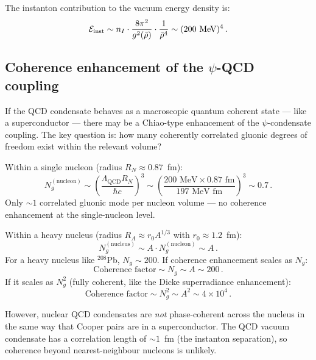 \documentclass[aps,prd,twocolumn,superscriptaddress,floatfix,nofootinbib]{revtex4-2}
\newcommand{\LQCD}{\Lambda_{\mathrm{QCD}}}
\begin{document}
The instanton contribution to the vacuum energy density is:
\begin{equation}
\mathcal{E}_{\rm inst} \sim n_I \cdot \frac{8\pi^2}{g^2(\bar{\rho})} \cdot
\frac{1}{\bar{\rho}^4} \sim (200 \text{ MeV})^4 \, .
\end{equation}

\subsection{Coherence enhancement of the $\psi$-QCD coupling}

If the QCD condensate behaves as a macroscopic quantum coherent state --- like a
superconductor --- there may be a Chiao-type enhancement of the
$\psi$-condensate coupling. The key question is: how many coherently correlated
gluonic degrees of freedom exist within the relevant volume?

Within a single nucleon (radius $R_N \approx 0.87$~fm):
\begin{equation}
N_g^{(\mathrm{nucleon})} \sim \left(\frac{\LQCD R_N}{\hbar c}\right)^3 \sim
\left(\frac{200 \text{ MeV} \times 0.87 \text{ fm}}{197 \text{ MeV fm}}\right)^3
\sim 0.7 \, .
\end{equation}
Only $\sim 1$ correlated gluonic mode per nucleon volume --- no coherence
enhancement at the single-nucleon level.

Within a heavy nucleus (radius $R_A \approx r_0 A^{1/3}$ with $r_0 \approx
1.2$~fm):
\begin{equation}
N_g^{(\mathrm{nucleus})} \sim A \cdot N_g^{(\mathrm{nucleon})} \sim A \, .
\end{equation}
For a heavy nucleus like ${}^{208}$Pb, $N_g \sim 200$. If coherence enhancement
scales as $N_g$:
\begin{equation}
\text{Coherence factor} \sim N_g \sim A \sim 200 \, .
\end{equation}
If it scales as $N_g^2$ (fully coherent, like the Dicke superradiance
enhancement):
\begin{equation}
\text{Coherence factor} \sim N_g^2 \sim A^2 \sim 4 \times 10^4 \, .
\end{equation}

However, nuclear QCD condensates are \emph{not} phase-coherent across the nucleus
in the same way that Cooper pairs are in a superconductor. The QCD vacuum
condensate has a correlation length of $\sim 1$~fm (the instanton separation),
so coherence beyond nearest-neighbour nucleons is unlikely.
\end{document}
